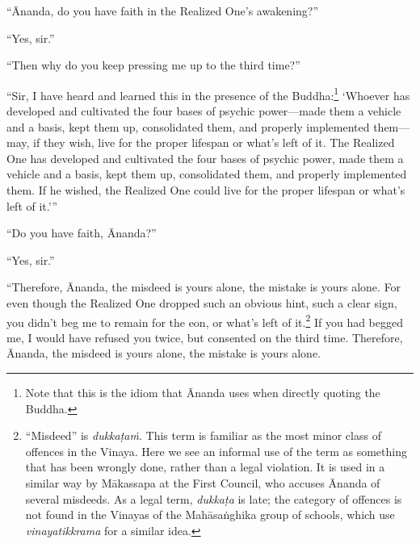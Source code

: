 \documentclass[12pt,openany]{book}%
\begin{document}
“Ānanda, do you have faith in the Realized One’s awakening?” 

“Yes, sir.” 

“Then why do you keep pressing me up to the third time?” 

“Sir, I have heard and learned this in the presence of the Buddha:\footnote{Note that this is the idiom that Ānanda uses when directly quoting the Buddha. } ‘Whoever has developed and cultivated the four bases of psychic power—made them a vehicle and a basis, kept them up, consolidated them, and properly implemented them—may, if they wish, live for the proper lifespan or what’s left of it. The Realized One has developed and cultivated the four bases of psychic power, made them a vehicle and a basis, kept them up, consolidated them, and properly implemented them. If he wished, the Realized One could live for the proper lifespan or what’s left of it.’” 

“Do you have faith, Ānanda?” 

“Yes, sir.” 

“Therefore, Ānanda, the misdeed is yours alone, the mistake is yours alone. For even though the Realized One dropped such an obvious hint, such a clear sign, you didn’t beg me to remain for the eon, or what’s left of it.\footnote{“Misdeed” is \textit{\textsanskrit{dukkaṭaṁ}}. This term is familiar as the most minor class of offences in the Vinaya. Here we see an informal use of the term as something that has been wrongly done, rather than a legal violation. It is used in a similar way by \textsanskrit{Mākassapa} at the First Council, who accuses Ānanda of several misdeeds. As a legal term, \textit{\textsanskrit{dukkaṭa}} is late; the category of offences is not found in the Vinayas of the \textsanskrit{Mahāsaṅghika} group of schools, which use \textit{vinayatikkrama} for a similar idea. } If you had begged me, I would have refused you twice, but consented on the third time. Therefore, Ānanda, the misdeed is yours alone, the mistake is yours alone. 
\end{document}
